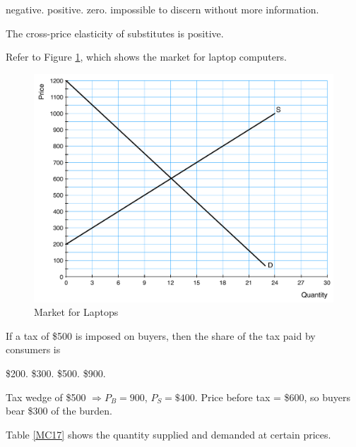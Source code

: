\documentclass[addpoints,11pt]{exam}
\theoremstyle{definition}
\begin{document}
\begin{questions}
	\begin{choices}
		\choice negative.
		\CorrectChoice positive.
		\choice zero.
		\choice impossible to discern without more information.
	\end{choices}
	
	\begin{solution}
		The cross-price elasticity of substitutes is positive.
	\end{solution}
	

	\question Refer to Figure \ref{MC16}, which shows the market for laptop computers.
	
\begin{figure}[H]
	\centering
	\includegraphics[scale=.45]{Exam1_MC16.pdf}
	\caption{Market for Laptops}
	\label{MC16}
\end{figure}

If a tax of \$500 is imposed on buyers, then the share of the tax paid by consumers is
	
	\begin{choices}
		\choice \$200.
		\CorrectChoice \$300.
		\choice \$500.
		\choice \$900.
	\end{choices}
	
	\begin{solution}
		Tax wedge of \$500 $\Rightarrow P_B = 900$, $P_S = \$400$. Price before tax = \$600, so buyers bear \$300 of the burden.
	\end{solution}
	
\newpage
	
	\question Table \ref{MC17} shows the quantity supplied and demanded at certain prices.


\end{questions}
\end{document}
